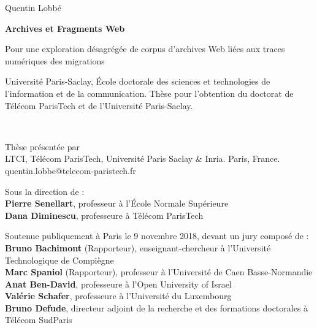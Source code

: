 \documentclass[symmetric,justified,marginals=raggedouter]{tufte-book}
\newcommand{\blankpage}{\newpage\hbox{}\thispagestyle{empty}\newpage}
\begin{document}
\frontmatter


\newpage
\author{Quentin Lobbé}
\title{}
\cleardoublepage
{  
  \begin{fullwidth}%
  \thispagestyle{empty} 
  \setlength{\parskip}{\baselineskip}
  \begingroup
  \vspace*{10em}
  \par\noindent\Large{Quentin Lobbé}
  \vspace*{-1em}
  \par\noindent\Huge\textbf{Archives et Fragments Web}
  \par\noindent\nohyphenation\Large{Pour une exploration désagrégée de corpus d'archives Web liées aux traces numériques des migrations}
  \endgroup
  \vfill  
  \par\noindent\nohyphenation Université Paris-Saclay, École doctorale des sciences et technologies de l'information et de la communication.  Thèse pour l'obtention du doctorat de Télécom ParisTech et de l'Université Paris-Saclay.    
  \end{fullwidth}%
}

\blankpage

  
\newpage
\begin{fullwidth}
~\vfill
\thispagestyle{empty}
\setlength{\parskip}{\baselineskip}

\par\noindent Thèse présentée par \textbf{\thanklessauthor}\\
LTCI, Télécom ParisTech, Université Paris Saclay \& Inria. Paris, France.\\
quentin.lobbe@telecom-paristech.fr

\par\noindent Sous la direction de :\\
\textbf{Pierre Senellart}, professeur à l'École Normale Supérieure\\
\textbf{Dana Diminescu}, professeure à Télécom ParisTech

\par\noindent Soutenue publiquement à Paris le 9 novembre 2018, devant un jury composé de :\\
\textbf{Bruno Bachimont} (Rapporteur), enseignant-chercheur à l'Université Technologique de Compiègne\\
\textbf{Marc Spaniol} (Rapporteur), professeur à l'Université de Caen Basse-Normandie\\
\textbf{Anat Ben-David}, professeure à l'Open University of Israel\\
\textbf{Valérie Schafer}, professeure à l'Université du Luxembourg\\
\textbf{Bruno Defude}, directeur adjoint de la recherche et des formations doctorales à Télécom SudParis


\end{fullwidth}
  
\end{document}
